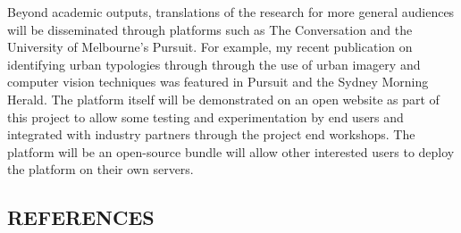 Beyond academic outputs, translations of the research for more general audiences will be disseminated through platforms such as The Conversation and the University of Melbourne's Pursuit. For example, my recent publication on identifying urban typologies through through the use of urban imagery and computer vision techniques was featured in Pursuit\cite{Nice2020c} and the Sydney Morning Herald\cite{Gladstone2018a}. The platform itself will be demonstrated on an open website as part of this project to allow some testing and experimentation by end users and integrated with industry partners through the project end workshops. The platform will be an open-source bundle will allow other interested users to deploy the platform on their own servers.  




\subsection*{\TitleFont REFERENCES}
\renewcommand{\refname}{\normalfont\selectfont\TitleFont REFERENCES} 
\begingroup
\fontsize{10pt}{10pt}\selectfont













%
